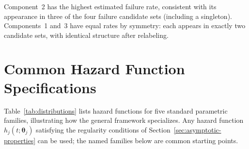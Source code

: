 \documentclass[11pt]{article}
\theoremstyle{definition}
\theoremstyle{plain}
\renewcommand{\v}[1]{\boldsymbol{#1}}
\begin{document}
Component~2 has the highest estimated failure rate, consistent with
its appearance in three of the four failure candidate sets (including
a singleton).
Components~1 and~3 have equal rates by symmetry: each appears in
exactly two candidate sets, with identical structure after relabeling.


\section{Common Hazard Function Specifications}
\label{sec:families}

Table~\ref{tab:distributions} lists hazard functions for five standard
parametric families, illustrating how the general framework specializes.
Any hazard function $h_j(t; \v{\theta}_j)$ satisfying the regularity
conditions of Section~\ref{sec:asymptotic-properties} can be used; the
named families below are common starting points.
\end{document}
